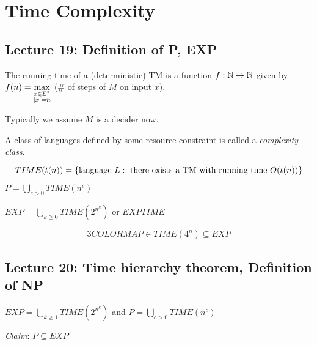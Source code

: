 \chapter{Time Complexity}

\section*{Lecture 19: Definition of P, EXP}

\begin{definition}
    The running time of a (deterministic) TM is a function $f:\mathbb{N} \rightarrow \mathbb{N}$ given by $f(n) = \max\limits_{\substack{x \in \Sigma^* \\ \left | x \right | = n}}^{}$ (\# of steps of $M$ on input $x$).
\end{definition}


Typically we assume $M$ is a decider now.

A class of languages defined by some resource constraint is called a \emph{complexity class}.

\begin{definition}
    \begin{dmath*}
        TIME(t(n)) = \set{\text{language } L : \text{ there exists a TM with running time } O(t(n))}
    \end{dmath*}
\end{definition}

\begin{definition}
    $P = \bigcup\limits_{c>0}^{} TIME(n^c)$
\end{definition}

\begin{definition}
    $EXP = \bigcup\limits_{k \geq 0} TIME(2^{n^k})$ or $EXPTIME$
\end{definition}

\begin{equation*}
    3COLORMAP \in TIME(4^n) \subseteq EXP
\end{equation*}

\section*{Lecture 20: Time hierarchy theorem, Definition of NP}

\begin{definition}
    $EXP = \bigcup\limits_{k \geq 1} TIME(2^{n^k})$ and $P = \bigcup\limits_{c > 0} TIME(n^c)$
\end{definition}

\emph{Claim}: $P \subseteq EXP$


